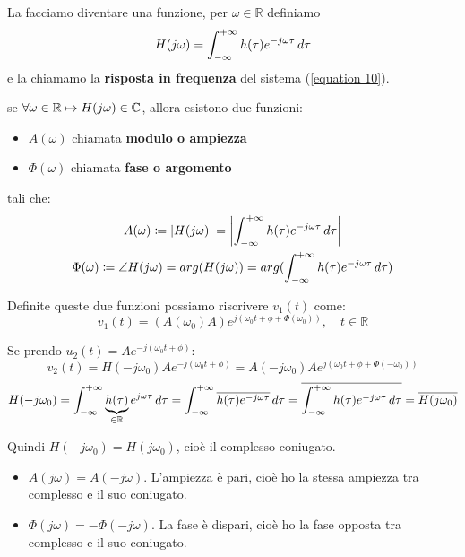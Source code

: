 	\begin{definizione}
		La facciamo diventare una funzione, per $ \omega \in \mathbb{R} $ definiamo
		\[
			H(j\omega)= \int_{-\infty}^{+\infty}h(\tau)e^{-j\omega \tau}\, d\tau
		\]
		e la chiamamo la \textbf{risposta in frequenza} del sistema (\ref{equation 10}).
	\end{definizione}
	

	\begin{definizione}
		se $ \forall\omega\in\mathbb{R} \mapsto H(j\omega)\in \mathbb{C}$, allora esistono due funzioni:
		\begin{itemize}
			\item $ A(\omega) $ chiamata \textbf{modulo o ampiezza}
			\item $ \Phi(\omega) $ chiamata \textbf{fase o argomento}
		\end{itemize}

		tali che:
		\begin{gather*}
			A(\omega)\coloneqq\abs{H(j\omega)}=\Abs{\int_{-\infty}^{+\infty}h(\tau)e^{-j\omega \tau}\d\tau}\\
			\Phi(\omega) \coloneqq \angle H(j\omega)=arg(H(j\omega))=arg(\int_{-\infty}^{+\infty}h(\tau)e^{-j\omega \tau}\d\tau)
		\end{gather*}
	\end{definizione}
	
	Definite queste due funzioni possiamo riscrivere $v_1(t) $ come:
	\[
		v_1(t) =(A(\omega_0)A)e^{j(\omega_0 t+\phi+\Phi(\omega_0))} , \quad t \in \mathbb{R}
	\]
	
	Se prendo $ u_2(t)= A e^{-j(\omega_0 t + \phi)}$:
	\[
		v_2(t)
		=H(-j\omega_0)Ae^{-j(\omega_0 t+\phi)}
		=A(-j\omega_0)Ae^{j(\omega_0 t+\phi+\Phi(-\omega_0))}
	\]
	\[
		H(-j\omega_0)
		=\int_{-\infty}^{+\infty}\underbrace{h(\tau)}_{\in\mathbb{R}}e^{j\omega \tau}\, d\tau
		= \int_{-\infty}^{+\infty}\overline{h(\tau)e^{-j\omega \tau}}\, d\tau
		= \overline{\int_{-\infty}^{+\infty}h(\tau)e^{-j\omega \tau}\, d\tau}
		= \overline{H(j\omega_0)}
	\]
	
	Quindi $ H(-j\omega_0)= \overline{H(j\omega_0)}$, cioè il complesso coniugato.
	
	\begin{itemize}
		\item	$ A(j\omega) =A(-j\omega)$. L'ampiezza è pari, cioè ho la stessa ampiezza tra complesso e il suo coniugato.
		\item $ \Phi(j\omega) =-\Phi(-j\omega)$. La fase è dispari, cioè ho la fase opposta tra complesso e il suo coniugato.
	\end{itemize}
	
